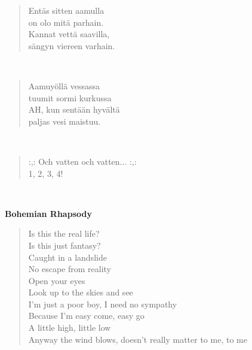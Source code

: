 \noindent\begin{minipage}{\linewidth}
\begin{verse}
	Entäs sitten aamulla\\
	on olo mitä parhain.\\
	Kannat vettä saavilla,\\
	sängyn viereen varhain.\\
\end{verse}
\end{minipage}\\[10pt]
\noindent\begin{minipage}{\linewidth}
\begin{verse}
	Aamuyöllä vessassa\\
	tuumit sormi kurkussa\\
	AH, kun sentään hyvältä\\
	paljas vesi maistuu.\\
\end{verse}
\end{minipage}\\[10pt]
\noindent\begin{minipage}{\linewidth}
\begin{verse}
	\hspace{0pt-\widthof{:,: }}:,: Och vatten och vatten... :,:\\
	1, 2, 3, 4!\\
\end{verse}
\end{minipage}\\[10pt]
%
%
\noindent\begin{minipage}{\linewidth}
\vspace{5pt}
\parbox[t]{0.85\linewidth}{\raggedright {\large\bf Bohemian Rhapsody}\\[6pt]}
\begin{verse}
	Is this the real life?\\
	Is this just fantasy?\\
	Caught in a landslide\\
	No escape from reality\\
	Open your eyes\\
	Look up to the skies and see\\
	I'm just a poor boy, I need no sympathy\\
	Because I'm easy come, easy go\\
	A little high, little low\\
	Anyway the wind blows, doesn't really matter to me, to me\\
\end{verse}
\end{minipage}\\[10pt]
